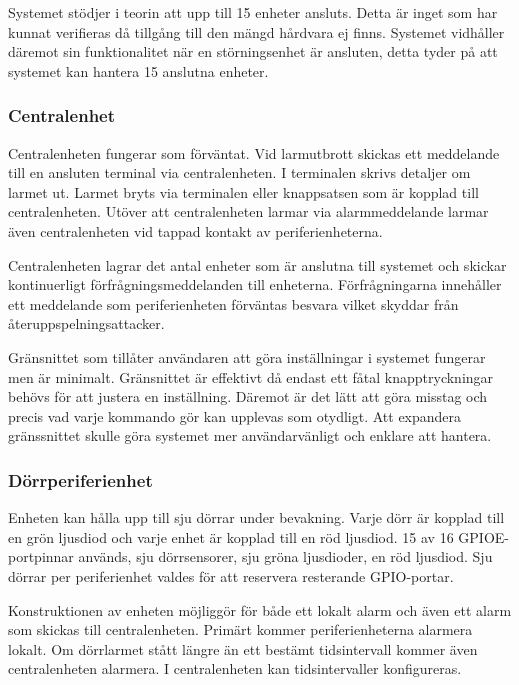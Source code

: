 \documentclass[a4paper]{article}
\newcommand{\todo}[1]{\marginpar{TODO: #1}\vspace{1cm}}
\begin{document}
Systemet stödjer i teorin att upp till 15 enheter ansluts. Detta är inget som har kunnat verifieras då tillgång till den mängd hårdvara ej finns.
Systemet vidhåller däremot sin funktionalitet när en störningsenhet är ansluten, detta tyder på att systemet kan hantera 15 anslutna enheter.

\subsubsection{Centralenhet}
Centralenheten fungerar som förväntat.
Vid larmutbrott skickas ett meddelande till en ansluten terminal via centralenheten.
I terminalen skrivs detaljer om larmet ut.
Larmet bryts via terminalen eller knappsatsen som är kopplad till centralenheten.
Utöver att centralenheten larmar via alarmmeddelande larmar även centralenheten vid tappad kontakt av periferienheterna.

Centralenheten lagrar det antal enheter som är anslutna till systemet och skickar kontinuerligt förfrågningsmeddelanden till enheterna.
Förfrågningarna innehåller ett meddelande som periferienheten förväntas besvara vilket skyddar från återuppspelningsattacker.

Gränsnittet som tillåter användaren att göra inställningar i systemet fungerar men är minimalt.
Gränsnittet är effektivt då endast ett fåtal knapptryckningar behövs för att justera en inställning.
Däremot är det lätt att göra misstag och precis vad varje kommando gör kan upplevas som otydligt.
Att expandera gränssnittet skulle göra systemet mer användarvänligt och enklare att hantera.

\subsubsection{Dörrperiferienhet}
\todo{Motivera varför 7 dörrar används}
Enheten kan hålla upp till sju dörrar under bevakning.
Varje dörr är kopplad till en grön ljusdiod och varje enhet är kopplad till en röd ljusdiod.
15 av 16 GPIOE-portpinnar används, sju dörrsensorer, sju gröna ljusdioder, en röd ljusdiod.
Sju dörrar per periferienhet valdes för att reservera resterande GPIO-portar.

Konstruktionen av enheten möjliggör för både ett lokalt alarm och även ett alarm som skickas till centralenheten.
Primärt kommer periferienheterna alarmera lokalt.
Om dörrlarmet stått längre än ett bestämt tidsintervall kommer även centralenheten alarmera.
I centralenheten kan tidsintervaller konfigureras.
\end{document}
